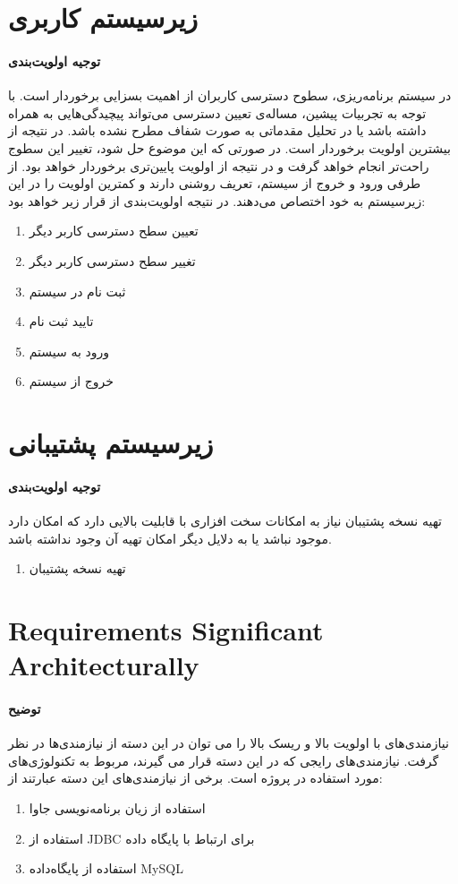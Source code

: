 \section{زیرسیستم کاربری}
\paragraph{توجیه اولویت‌بندی}
در سیستم برنامه‌ریزی، سطوح دسترسی کاربران از اهمیت بسزایی برخوردار است. با توجه به تجربیات پیشین، مساله‌ی تعیین دسترسی می‌تواند پیچیدگی‌هایی به همراه داشته باشد یا در تحلیل مقدماتی به صورت  شفاف مطرح نشده باشد. در نتیجه از بیشترین اولویت برخوردار است. در صورتی که این موضوع حل شود، تغییر این سطوج راحت‌تر انجام خواهد گرفت و در نتیجه از اولویت پایین‌تری برخوردار خواهد بود. از طرفی ورود و خروج از سیستم، تعریف روشنی دارند و کمترین اولویت را در این زیرسیستم به خود اختصاص می‌دهند. در نتیجه اولویت‌بندی از قرار زیر خواهد بود:
\begin{enumerate}
	\item تعیین سطح دسترسی کاربر دیگر
	\item تغییر سطح دسترسی کاربر دیگر
	\item ثبت نام در سیستم
	\item تایید ثبت نام
	\item ورود به سیستم
	\item خروج از سیستم			
\end{enumerate}

\section{زیرسیستم پشتیبانی}
\paragraph{توجیه اولویت‌بندی}
تهیه نسخه پشتیبان نیاز به امکانات سخت افزاری با قابلیت بالایی دارد که امکان دارد موجود نباشد یا به دلایل دیگر امکان تهیه آن وجود نداشته باشد.
\begin{enumerate}
	
	\item تهیه نسخه پشتیبان
\end{enumerate}

\section{Requirements Significant Architecturally}
\paragraph{توضیح}
نیازمندی‌های با اولویت بالا و ریسک بالا را می توان در این دسته از نیازمندی‌ها در نظر گرفت. نیازمندی‌های رایجی که در این دسته قرار می گیرند، مربوط به تکنولوژی‌های مورد استفاده در پروژه است. برخی از نیازمندی‌های این دسته عبارتند از:
\begin{enumerate}
	
	\item استفاده از زیان برنامه‌نویسی جاوا
	\item استفاده از JDBC برای ارتباط با پایگاه داده
	\item استفاده از پایگاه‌داده MySQL
	
\end{enumerate}